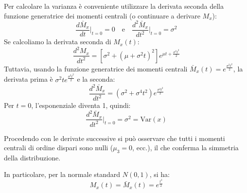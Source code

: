 \documentclass[openany,a4paper,12pt]{book}
\theoremstyle{remark}
\begin{document}
Per calcolare la varianza è conveniente utilizzare la derivata seconda della funzione generatrice dei momenti centrali (o continuare a derivare $M_x$):
\begin{equation}
\frac{d \bar{M}_x}{dt} \bigg\rvert_{t=0} = 0 \quad \text{e} \quad \frac{d^2 \bar{M}_x}{dt^2} \bigg\rvert_{t=0} = \sigma^2
\end{equation}
Se calcoliamo la derivata seconda di $M_x(t)$:
\begin{equation}
\frac{d^2 M_x}{dt^2} = \left[ \sigma^2 + (\mu + \sigma^2 t)^2 \right] e^{\mu t + \frac{\sigma^2 t^2}{2}}
\end{equation}
Tuttavia, usando la funzione generatrice dei momenti centrali $\bar{M}_x(t) = e^{\frac{\sigma^2 t^2}{2}}$, la derivata prima è $\sigma^2 t e^{\frac{\sigma^2 t^2}{2}}$ e la seconda:
\begin{equation}
\frac{d^2 \bar{M}_x}{dt^2} = (\sigma^2 + \sigma^4 t^2) e^{\frac{\sigma^2 t^2}{2}}
\end{equation}
Per $t=0$, l'esponenziale diventa 1, quindi:
\begin{equation}
\frac{d^2 \bar{M}_x}{dt^2} \bigg\rvert_{t=0} = \sigma^2 = \text{Var}(x)
\end{equation}

Procedendo con le derivate successive si può osservare che tutti i momenti centrali di ordine dispari sono nulli ($\mu_3 = 0$, ecc.), il che conferma la simmetria della distribuzione.

In particolare, per la normale standard $N(0,1)$, si ha:
\begin{equation}
M_x(t) = \bar{M}_x(t) = e^{\frac{t^2}{2}}
\end{equation}
\end{document}
